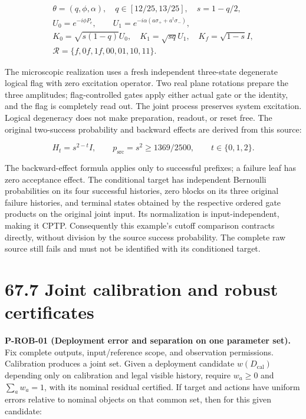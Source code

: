 \documentclass[
  11pt,
  oneside]{book}
\begin{document}
\[
\begin{gathered}
\theta=(q,\phi,\alpha),\quad q\in[12/25,13/25],\quad s=1-q/2,\\
U_0=e^{-i\phi P_e},\qquad
U_1=e^{-i\alpha(a\sigma_++a^\dagger\sigma_-)},\\
K_0=\sqrt{s(1-q)}U_0,\quad
K_1=\sqrt{sq}U_1,\quad K_f=\sqrt{1-s}I,\\
\mathcal R=\{f,0f,1f,00,01,10,11\}.
\end{gathered}
\]

The microscopic realization uses a fresh independent three-state
degenerate logical flag with zero excitation operator. Two real plane
rotations prepare the three amplitudes; flag-controlled gates apply
either actual gate or the identity, and the flag is completely read out.
The joint process preserves system excitation. Logical degeneracy does
not make preparation, readout, or reset free. The original two-success
probability and backward effects are derived from this source:

\[
H_t=s^{2-t}I,\qquad p_{\mathrm{src}}=s^2\ge1369/2500,
\qquad t\in\{0,1,2\}.
\]

The backward-effect formula applies only to successful prefixes; a
failure leaf has zero acceptance effect. The conditional target has
independent Bernoulli probabilities on its four successful histories,
zero blocks on its three original failure histories, and terminal states
obtained by the respective ordered gate products on the original joint
input. Its normalization is input-independent, making it CPTP.
Consequently this example's cutoff comparison contracts directly,
without division by the source success probability. The complete raw
source still fails and must not be identified with its conditioned
target.

\section{67.7 Joint calibration and robust certificates}

\label{p-rob-01}{}

\textbf{P-ROB-01 (Deployment error and separation on one parameter
set).} Fix complete outputs, input/reference scope, and observation
permissions. Calibration produces a joint set. Given a deployment
candidate \(w(D_{\mathrm{cal}})\) depending only on calibration and
legal visible history, require \(w_a\ge0\) and \(\sum_a w_a=1\), with
its nominal residual certified. If target and actions have uniform
errors relative to nominal objects on that common set, then for this
given candidate:
\end{document}
